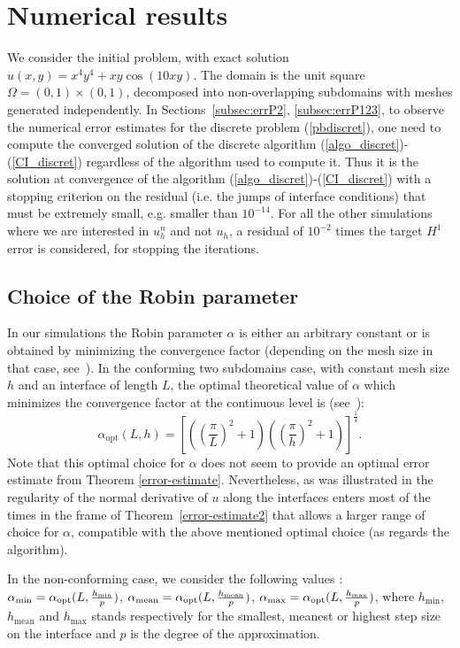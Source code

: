 \documentclass[final]{siamltex}
\begin{document}
\section{Numerical results}\label{sec:numresults} 
We consider the initial problem, with exact solution $u(x,y)=x^4y^4+xy\cos(10xy)$.
The domain is the unit square $\Omega=(0,1) \times (0,1)$,
decomposed into non-overlapping subdomains with meshes generated independently.
In Sections~\ref{subsec:errP2}, \ref{subsec:errP123}, to observe the numerical error estimates for the 
discrete problem (\ref{pbdiscret}), one need to compute the converged solution of the discrete algorithm
(\ref{algo_discret})-(\ref{CI_discret}) regardless of the algorithm used to compute it. Thus it is
the solution at convergence of the algorithm (\ref{algo_discret})-(\ref{CI_discret}) with a stopping criterion on
the residual (i.e. the jumps of interface conditions) that must be extremely small, e.g. smaller than $10^{-14}$.
For all the other simulations where we are interested in $u_h^n$ and not $u_h$, a residual of $10^{-2}$ times the
target $H^1$ error is considered, for stopping the iterations.
\subsection{Choice of the Robin parameter}\label{Sec:alpha}
In our simulations the Robin parameter $\alpha$ is either an arbitrary constant
or is obtained by minimizing the convergence factor (depending on the
mesh size in that case, see~\cite{JMN10}).  In the conforming two subdomains case, with
constant mesh size $h$ and an interface of length $L$, the optimal theoretical value of $\alpha$
which minimizes the convergence factor at the continuous level is (see~\cite{Gander06}):
\vspace{-5mm}
\begin{equation}\label{eq.alphaopt}
\alpha_{\text{opt}}(L,h)=[((\frac{\pi}{L})^2+1)((\frac{\pi}{h})^2+1)]^{\frac{1}{4}}.
\end{equation}
Note that this optimal choice for $\alpha$ does not seem to provide an
optimal error estimate from Theorem \ref{error-estimate}.
Nevertheless, as was illustrated in \cite{JMN10}
the regularity of the normal derivative of $u$ along the interfaces
enters most of the times in the frame of Theorem~\ref{error-estimate2}
that allows a larger range of choice for $\alpha$, compatible with the
above mentioned optimal choice (as regards the algorithm).

In the non-conforming case, we consider the following values : 
$\alpha_{\text{min}}=\alpha_{\text{opt}}(L,{h_{\text{min}} \over p})$,
$\alpha_{\text{mean}}=\alpha_{\text{opt}}(L,{h_{\text{mean}}\over p})$,
$\alpha_{\text{max}}=\alpha_{\text{opt}}(L,{h_{\text{max}}\over p})$,
where $h_{\text{min}}$, $h_{\text{mean}}$ and $h_{\text{max}}$ stands respectively for the
smallest, meanest or highest step size on the interface and $p$ is the degree of the approximation.
\end{document}
